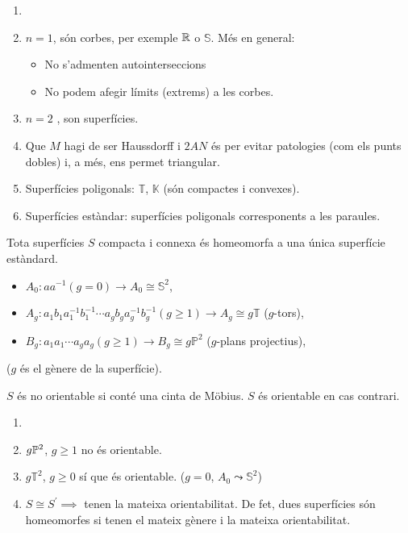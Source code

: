 \begin{example}
    \begin{enumerate}
	\item[]
	\item $n = 1$, són corbes, per exemple $\mathbb{R}$ o $\mathbb{S}$. Més en general:
	    \begin{itemize}
		\item No s'admenten autointerseccions
		\item No podem afegir límits (extrems) a les corbes.
	    \end{itemize}
	\item $n = 2$ , son superfícies.
	\item Que $M$ hagi de ser Haussdorff i $2AN$ és per evitar patologies (com els punts
	    dobles) i, a més, ens permet triangular.
	\item Superfícies poligonals: $\mathbb{T}$, $\mathbb{K}$ (són compactes i convexes).
	\item Superfícies estàndar: superfícies poligonals corresponents a les paraules.
    \end{enumerate}
\end{example}

\begin{teo*}[C]
    Tota superfícies $S$ compacta i connexa és homeomorfa a una única superfície estàndard.
    \begin{itemize}
	\item $A_0 \colon aa^{-1} (g = 0) \rightarrow A_0 \cong \mathbb{S}^2$,
	\item $A_g \colon a_1b_1a^{-1}_1 b^{-1}_1 \cdots a_gb_ga^{-1}_gb^{-1}_g (g \geq 1)
	    \rightarrow A_g \cong g \mathbb{T}$ ($g$-tors),
	\item $B_g \colon a_1a_1 \cdots a_ga_g (g \geq 1) \rightarrow B_g \cong g \mathbb{P}^2$
	    ($g$-plans projectius),
    \end{itemize}
    ($g$ és el gènere de la superfície).
\end{teo*}

\begin{defi}[Orientabilitat]
    $S$ és no orientable si conté una cinta de Möbius. $S$ és orientable en cas contrari.
\end{defi}

\begin{example}
    \begin{enumerate}
	\item[]
	\item $g \mathbb{P}^2$, $g \geq 1$ no és orientable.
	\item $g \mathbb{T}^2$, $g \geq 0$ sí que és orientable. ($g = 0$, $A_0 \leadsto \mathbb{S}^2$)
	\item $S \cong S^\prime \implies $ tenen la mateixa orientabilitat. De fet, dues superfícies
	    són homeomorfes si tenen el mateix gènere i la mateixa orientabilitat.
    \end{enumerate}
\end{example}

